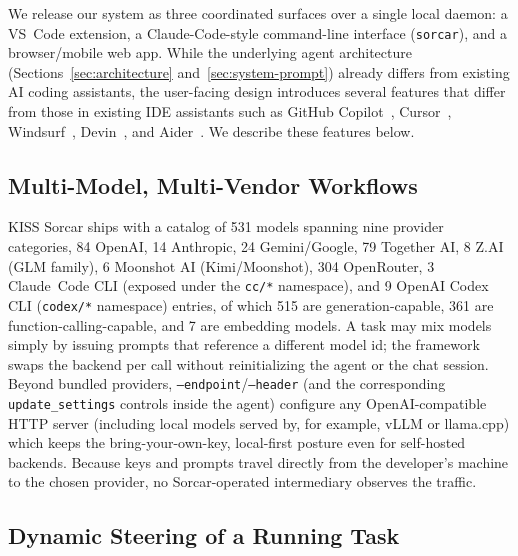 \documentclass{article}
\begin{document}
We release our system as three coordinated surfaces over a single local daemon: a VS~Code extension, a Claude-Code-style command-line interface (\texttt{sorcar}), and a browser/mobile web app.  While the underlying agent architecture (Sections~\ref{sec:architecture} and~\ref{sec:system-prompt}) already differs from existing AI coding assistants, the user-facing design introduces several features that differ from those in existing IDE assistants such as GitHub Copilot~\citep{copilot2021}, Cursor~\citep{cursor2024}, Windsurf~\citep{windsurf2024}, Devin~\citep{devin2024}, and Aider~\citep{aider2023}.  We describe these features below.

\subsection{Multi-Model, Multi-Vendor Workflows}
\label{sec:multi-model-feature}

KISS Sorcar ships with a catalog of 531 models spanning nine provider categories, 84 OpenAI, 14 Anthropic, 24 Gemini/Google, 79 Together AI, 8 Z.AI (GLM family), 6 Moonshot AI (Kimi/Moonshot), 304 OpenRouter, 3 Claude~Code CLI (exposed under the \texttt{cc/*} namespace), and 9 OpenAI Codex CLI (\texttt{codex/*} namespace) entries, of which 515 are generation-capable, 361 are function-calling-capable, and 7 are embedding models.  A task may mix models simply by issuing prompts that reference a different model id; the framework swaps the backend per call without reinitializing the agent or the chat session.  Beyond bundled providers, \texttt{--endpoint}/\texttt{--header} (and the corresponding \texttt{update\_settings} controls inside the agent) configure any OpenAI-compatible HTTP server (including local models served by, for example, vLLM or llama.cpp) which keeps the bring-your-own-key, local-first posture even for self-hosted backends.  Because keys and prompts travel directly from the developer's machine to the chosen provider, no Sorcar-operated intermediary observes the traffic.

\subsection{Dynamic Steering of a Running Task}
\label{sec:dynamic-steering-feature}
\end{document}
